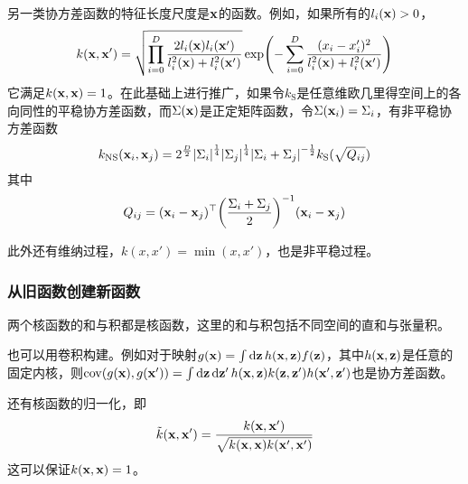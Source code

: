\documentclass[12pt,UTF8]{article}
\begin{document}
                另一类协方差函数的特征长度尺度是$\vb{x}$的函数。例如，如果所有的$l_i(\vb{x})>0$，
                \begin{equation}
                    k(\vb{x},\vb{x}')=\sqrt{\prod_{i=0}^D{\frac{2l_i(\vb{x})l_i(\vb{x}')}{l_i^2(\vb{x})+l_i^2(\vb{x}')}}}\exp(-\sum_{i=0}^{D}{\frac{(x_i-x'_i)^2}{l_i^2(\vb{x})+l_i^2(\vb{x}')}})
                \end{equation}
                它满足$k(\vb{x},\vb{x})=1$。在此基础上进行推广，如果令$k_{\mathrm{S}}$是任意维欧几里得空间上的各向同性的平稳协方差函数，而$\Sigma(\vb{x})$是正定矩阵函数，令$\Sigma(\vb{x}_i)=\Sigma_i$，有非平稳协方差函数
                \begin{equation}
                    k_{\mathrm{NS}}(\vb{x}_i,\vb{x}_j)=2^{\frac{D}{2}}\abs{\Sigma_i}^{\frac{1}{4}}\abs{\Sigma_j}^{\frac{1}{4}}\abs{\Sigma_i+\Sigma_j}^{-\frac{1}{2}}k_\mathrm{S}(\sqrt{Q_{ij}})
                \end{equation}
                其中
                \begin{equation}
                    Q_{ij}=(\vb{x}_i-\vb{x}_j)^\top\qty(\frac{\Sigma_i+\Sigma_j}{2})^{-1}(\vb{x}_i-\vb{x}_j)
                \end{equation}\par
                此外还有维纳过程，$k(x,x')=\min(x,x')$，也是非平稳过程。
            \subsubsection{从旧函数创建新函数}
                两个核函数的和与积都是核函数，这里的和与积包括不同空间的直和与张量积。\par
                也可以用卷积构建。例如对于映射$g(\vb{x})=\int{\dd{\vb{z}}h(\vb{x},\vb{z})f(\vb{z})}$，其中$h(\vb{x},\vb{z})$是任意的固定内核，则$\mathrm{cov}(g(\vb{x}),g(\vb{x}'))=\int{\dd{\vb{z}}\dd{\vb{z}'}h(\vb{x},\vb{z})k(\vb{z},\vb{z}')h(\vb{x}',\vb{z}')}$也是协方差函数。\par
                还有核函数的归一化，即
                \begin{equation}
                    \tilde{k}(\vb{x},\vb{x}')=\frac{k(\vb{x},\vb{x}')}{\sqrt{k(\vb{x},\vb{x})k(\vb{x}',\vb{x}')}}
                \end{equation}
                这可以保证$k(\vb{x},\vb{x})=1$。
\end{document}
